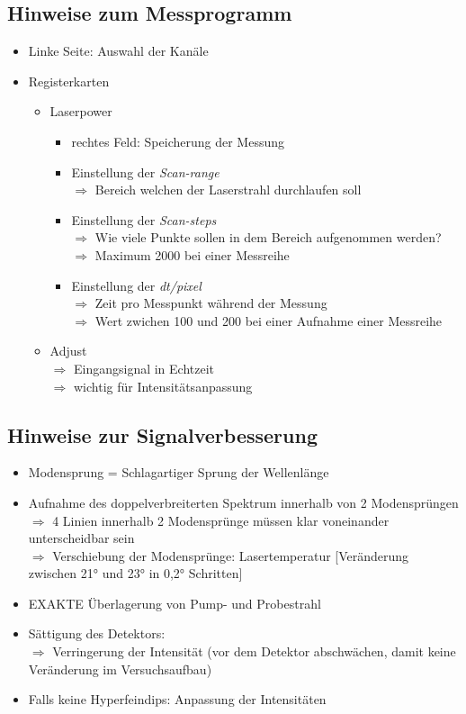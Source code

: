 \documentclass[a4paper, twoside]{article}
\begin{document}
\subsection{Hinweise zum Messprogramm}
\begin{itemize}
    \item Linke Seite: Auswahl der Kanäle
    \item Registerkarten
    \begin{itemize}
        \item Laserpower
        \begin{itemize}
            \item rechtes Feld: Speicherung der Messung
            \item Einstellung der \textit{Scan-range} \\
                $\Rightarrow$ Bereich welchen der Laserstrahl durchlaufen soll
            \item Einstellung der \textit{Scan-steps} \\
                $\Rightarrow$ Wie viele Punkte sollen in dem Bereich aufgenommen werden?\\
                $\Rightarrow$ Maximum 2000 bei einer Messreihe
            \item Einstellung der \textit{dt/pixel}\\
            $\Rightarrow$ Zeit pro Messpunkt während der Messung \\
            $\Rightarrow$ Wert zwichen 100 und 200 bei einer Aufnahme einer Messreihe 
        \end{itemize}
        \item Adjust\\
        $\Rightarrow$ Eingangsignal in Echtzeit\\
        $\Rightarrow$ wichtig für Intensitätsanpassung
    \end{itemize}
\end{itemize}
\subsection{Hinweise zur Signalverbesserung}
\begin{itemize}
    \item Modensprung = Schlagartiger Sprung der Wellenlänge
    \item Aufnahme des doppelverbreiterten Spektrum innerhalb von 2 Modensprüngen\\
    $\Rightarrow$ 4 Linien innerhalb 2 Modensprünge müssen klar voneinander unterscheidbar sein\\
    $\Rightarrow$ Verschiebung der Modensprünge: Lasertemperatur [Veränderung zwischen 21° und 23° in 0,2° Schritten]
    \item EXAKTE Überlagerung von Pump- und Probestrahl
    \item Sättigung des Detektors: \\
    $\Rightarrow$ Verringerung der Intensität (vor dem Detektor abschwächen, damit keine Veränderung im Versuchsaufbau)
    \item Falls keine Hyperfeindips: Anpassung der Intensitäten 
\end{itemize}
\newpage
\end{document}

